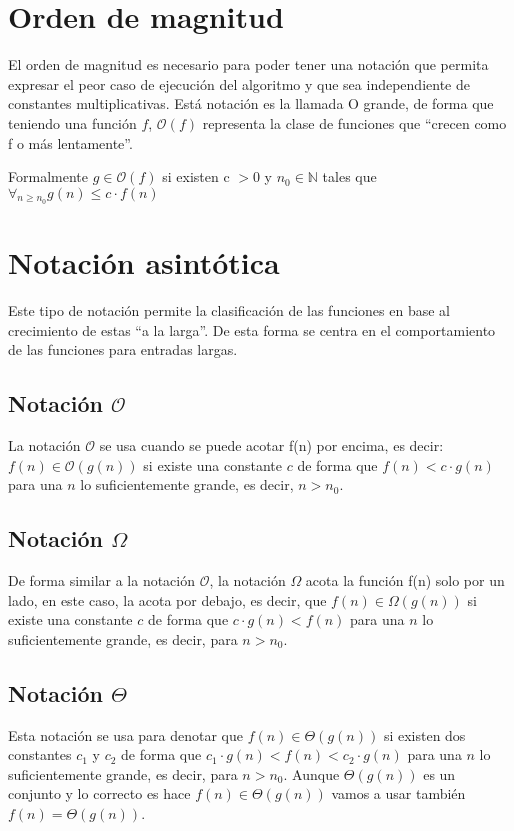 \section{Orden de magnitud}
El orden de magnitud es necesario para poder tener una notación que permita
expresar el peor caso de ejecución del algoritmo y que sea independiente de
constantes multiplicativas. Está notación es la llamada O grande, de forma que
teniendo una función $f$, $\mathcal{O}(f)$ representa la clase de funciones que
``crecen como f o más lentamente''.

Formalmente $g \in \mathcal{O}(f)$ si existen c $> 0$ y $n_0 \in \mathbb{N}$
tales que $\forall_{n \geq n_0} g(n) \leq c \cdot f(n)$  

\section{Notación asintótica}

Este tipo de notación permite la clasificación de las funciones en base al
crecimiento de estas ``a la larga''. De esta forma se centra en el
comportamiento de las funciones para entradas largas. 

\subsection{Notación $\mathcal{O}$}

La notación $\mathcal{O}$ se usa cuando se puede acotar f(n) por encima, es
decir: $f(n) \in \mathcal{O}(g(n))$ si existe una constante $c$ de forma que
$f(n) < c \cdot g(n)$ para una $n$ lo suficientemente grande, es decir, $n >
n_0$.

\subsection{Notación $\Omega$}

De forma similar a la notación $\mathcal{O}$, la notación $\Omega$ acota la
función f(n) solo por un lado, en este caso, la acota por debajo, es decir, que
$f(n) \in \Omega(g(n))$ si existe una constante $c$ de forma que $c \cdot g(n)
< f(n)$ para una $n$ lo suficientemente grande, es decir, para $n > n_0$.

\subsection{Notación $\Theta$}

Esta notación se usa para denotar que $f(n) \in \Theta(g(n))$ si existen dos
constantes $c_1$ y $c_2$ de forma que $c_1 \cdot g(n) < f(n) < c_2 \cdot g(n)$
para una $n$ lo suficientemente grande, es decir, para $n > n_0$. Aunque
$\Theta(g(n))$ es un conjunto y lo correcto es hace $f(n) \in \Theta(g(n))$
vamos a usar también $f(n) = \Theta(g(n))$.

